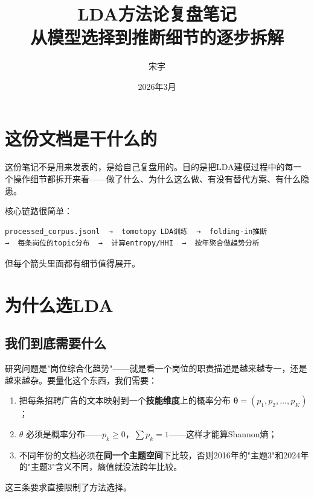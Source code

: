 \documentclass[12pt,a4paper]{ctexart}
\title{\textbf{LDA方法论复盘笔记}\\[0.5em]
\large 从模型选择到推断细节的逐步拆解}
\author{宋宇}
\date{2026年3月}
\begin{document}
\maketitle
\tableofcontents
\newpage


\section{这份文档是干什么的}

这份笔记不是用来发表的，是给自己复盘用的。目的是把LDA建模过程中的每一个操作细节都拆开来看——做了什么、为什么这么做、有没有替代方案、有什么隐患。

核心链路很简单：

\begin{verbatim}
processed_corpus.jsonl  →  tomotopy LDA训练  →  folding-in推断
→  每条岗位的topic分布  →  计算entropy/HHI  →  按年聚合做趋势分析
\end{verbatim}

但每个箭头里面都有细节值得展开。


\section{为什么选LDA}
\label{sec:why-lda}

\subsection{我们到底需要什么}

研究问题是"岗位综合化趋势"——就是看一个岗位的职责描述是越来越专一，还是越来越杂。要量化这个东西，我们需要：

\begin{enumerate}
\item 把每条招聘广告的文本映射到一个\textbf{技能维度}上的概率分布 $\boldsymbol{\theta} = (p_1, p_2, \dots, p_K)$；
\item $\theta$ 必须是概率分布——$p_k \geq 0$，$\sum p_k = 1$——这样才能算Shannon熵；
\item 不同年份的文档必须在\textbf{同一个主题空间}下比较，否则2016年的"主题3"和2024年的"主题3"含义不同，熵值就没法跨年比较。
\end{enumerate}

这三条要求直接限制了方法选择。
\end{document}
